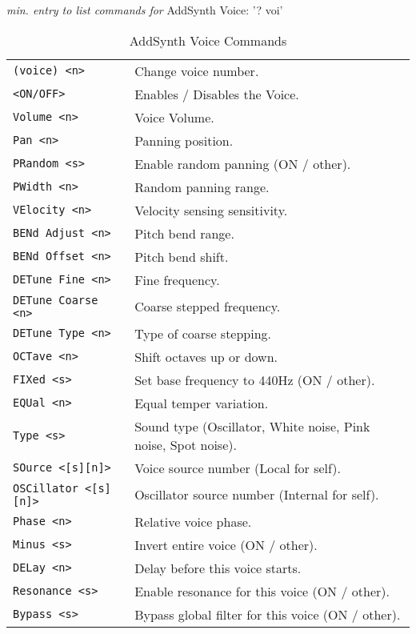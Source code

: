 \pagebreak
   \textsl{min. entry to list commands for} AddSynth Voice: '? voi'
   \begin{table}[H]
      \caption{AddSynth Voice Commands}
      \label{table:yoshimi_part_addsynth_voice_commands}
      \begin{tabular}{l l}
\texttt{(voice) <n>} &
   Change voice number.  \\
\texttt{<ON/OFF>} &
   Enables / Disables the Voice. \\
\texttt{Volume <n>} &
   Voice Volume.  \\
\texttt{Pan <n>} &
   Panning position.\\
\texttt{PRandom <s>} &
   Enable random panning (ON / other).\\
\texttt{PWidth <n>} &
   Random panning range.\\
\texttt{VElocity <n>} &
   Velocity sensing sensitivity. \\
\texttt{BENd Adjust <n>} &
   Pitch bend range. \\
\texttt{BENd Offset <n>} &
   Pitch bend shift. \\
\texttt{DETune Fine <n>} &
   Fine frequency.   \\
\texttt{DETune Coarse <n>} &
   Coarse stepped frequency.  \\
\texttt{DETune Type <n>} &
   Type of coarse stepping.   \\
\texttt{OCTave <n>} &
   Shift octaves up or down.  \\
\texttt{FIXed <s>} &
   Set base frequency to 440Hz (ON / other).  \\
\texttt{EQUal <n>} &
   Equal temper variation. \\
\texttt{Type <s>} &
   Sound type (Oscillator, White noise, Pink noise, Spot noise). \\
\texttt{SOurce <[s][n]>} &
   Voice source number (Local for self). \\
\texttt{OSCillator <[s][n]>} &
   Oscillator source number (Internal for self). \\
\texttt{Phase <n>} &
   Relative voice phase. \\
\texttt{Minus <s>} &
   Invert entire voice (ON / other). \\
\texttt{DELay <n>} &
   Delay before this voice starts. \\
\texttt{Resonance <s>} &
   Enable resonance for this voice (ON / other). \\
\texttt{Bypass <s>} &
   Bypass global filter for this voice (ON / other). \\

\end{tabular}
\end{table}
